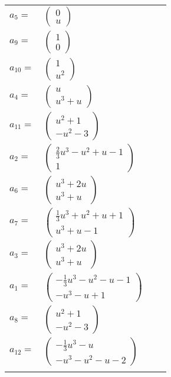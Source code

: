 \documentclass[1p]{elsarticle_modified}
\theoremstyle{definition}
\begin{document}
\begin{tabular}{m{7pt} m{180pt} m{7pt} m{180pt} }
\flushright $a_{5}=$&$\begin{pmatrix}0\\u\end{pmatrix}$ \\
\flushright $a_{9}=$&$\begin{pmatrix}1\\0\end{pmatrix}$ \\
\flushright $a_{10}=$&$\begin{pmatrix}1\\u^2\end{pmatrix}$ \\
\flushright $a_{4}=$&$\begin{pmatrix}u\\u^3+u\end{pmatrix}$ \\
\flushright $a_{11}=$&$\begin{pmatrix}u^2+1\\- u^2-3\end{pmatrix}$ \\
\flushright $a_{2}=$&$\begin{pmatrix}\frac{2}{3} u^3- u^2+u-1\\1\end{pmatrix}$ \\
\flushright $a_{6}=$&$\begin{pmatrix}u^3+2 u\\u^3+u\end{pmatrix}$ \\
\flushright $a_{7}=$&$\begin{pmatrix}\frac{1}{3} u^3+u^2+u+1\\u^3+u-1\end{pmatrix}$ \\
\flushright $a_{3}=$&$\begin{pmatrix}u^3+2 u\\u^3+u\end{pmatrix}$ \\
\flushright $a_{1}=$&$\begin{pmatrix}-\frac{1}{3} u^3- u^2- u-1\\- u^3- u+1\end{pmatrix}$ \\
\flushright $a_{8}=$&$\begin{pmatrix}u^2+1\\- u^2-3\end{pmatrix}$ \\
\flushright $a_{12}=$&$\begin{pmatrix}-\frac{1}{3} u^3- u\\- u^3- u^2- u-2\end{pmatrix}$\\&\end{tabular}
\end{document}
